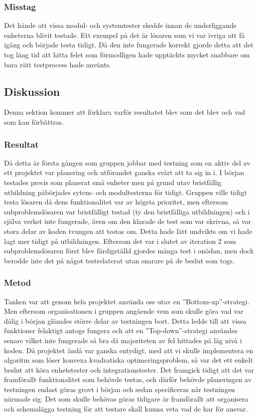 	\subsubsection{Misstag}
	Det hände att vissa modul- och systemtester skedde innan de underliggande enheterna blivit testade. Ett exempel på det är lösaren som vi var ivriga att få igång och började testa tidigt. Då den inte fungerade korrekt gjorde detta att det tog lång tid att hitta felet som förmodligen hade upptäckts mycket snabbare om bara rätt testprocess hade använts.
	
	\subsection{Diskussion}
	Denna sektion kommer att förklara varför resultatet blev som det blev och vad som kan förbättras.	
	
	\subsubsection{Resultat}
	Då detta är första gången som gruppen jobbar med testning som en aktiv del av ett projektet var planering och utförandet ganska svårt att ta sig in i. I början testades precis som planerat små enheter men på grund utav bristfällig utbildning påbörjades sytem- och modultesterna för tidigt. Gruppen ville tidigt testa lösaren då dens funktionalitet var av högsta prioritet, men eftersom subproblemslösaren var bristfälligt testad (ty den bristfälliga utbildningen) och i själva verket inte fungerade, även om den klarade de test som var skrivna, så var stora delar av koden tvungen att testas om. Detta hade lätt undvikts om vi hade lagt mer tidigt på utbildningen. Eftersom det var i slutet av iteration 2 som subproblemslösaren först blev färdigställd gjordes många test i onödan, men dock berodde inte det på något testrelaterat utan snarare på de beslut som togs. 
	
	\subsubsection{Metod}
	Tanken var att genom hela projektet använda oss utav en ''Bottom-up''-strategi. Men eftersom organisationen i gruppen angående vem som skulle göra vad var dålig i början glömdes större delar av testningen bort. Detta ledde till att vissa funktioner felaktigt antogs fungera och att en ''Top-down''-strategi användes senare vilket inte fungerade så bra då majoriteten av fel hittades på låg nivå i koden.
	Då projektet ändå var ganska entydigt, med att vi skulle implementera en algoritm som löser konvexa kvadratiska optimeringsproblem, så var det ett enkelt beslut att köra enhetstester och integrationstester. Det framgick tidigt att det var framförallt funktionalitet som behövde testas, och därför behövde planeringen av testningen endast göras grovt i början och sedan specificeras när testningen närmade sig. Det som skulle behövas göras tidigare är framförallt att organisera och schemalägga testning för att testare skall kunna veta vad de har för ansvar. 
	
